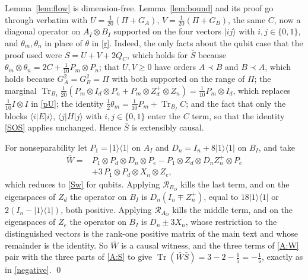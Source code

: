 \documentclass[aps,prl,reprint,superscriptaddress,nofootinbib,longbibliography,raggedbottom]{revtex4-2}
\DeclareMathOperator{\Tr}{Tr}
\newcommand{\R}{\mathcal R}
\newcommand{\ket}[1]{\lvert #1\rangle}
\newcommand{\bra}[1]{\langle #1\rvert}
\newcommand{\proj}[1]{\ket{#1}\!\bra{#1}}
\begin{document}
Lemma~\ref{lem:flow} is dimension-free. Lemma~\ref{lem:bound} and its
proof go through verbatim with $U=\tfrac1{20}(\Pi+G_A)$,
$V=\tfrac1{20}(\Pi+G_B)$, the same $C$, now a diagonal operator on
$A_I\otimes B_I$ supported on the four vectors $\ket{ij}$ with
$i,j\in\{0,1\}$, and $\theta_m,\theta_n$ in place of $\theta$ in
\eqref{r}. Indeed, the only facts about the qubit case that the proof used
were $S=U+V+2Q_C$, which holds for $\bar S$ because
$\theta_m\otimes\theta_n=2C+\tfrac1{10}P_m\otimes P_n$; that $U,V\geq0$
have orders $A\prec B$ and $B\prec A$, which holds because
$G_A^2=G_B^2=\Pi$ with both supported on the range of $\Pi$; the marginal
$\Tr_{B_I}\tfrac1{20}(P_m\otimes I_d\otimes P_n+P_m\otimes Z_d^+\otimes
Z_n)=\tfrac1{10}P_m\otimes I_d$, which replaces
$\tfrac1{10}I\otimes I$ in \eqref{pU}; the identity
$\tfrac12\theta_m=\tfrac1{10}P_m+\Tr_{B_I}C$; and the fact that only the
blocks $\bra iE\ket i$, $\bra jH\ket j$ with $i,j\in\{0,1\}$ enter the
$C$ term, so that the identity \eqref{SOS} applies unchanged. Hence
$\bar S$ is extensibly causal.

For nonseparability let $P_1=\proj1$ on $A_I$ and $D_n=I_n+8\proj1$ on
$B_I$, and take
\begin{equation}\label{A:W}
\begin{split}
\bar W={}&P_1\otimes P_d\otimes D_n\otimes P_e
 -P_1\otimes Z_d\otimes D_nZ_n^+\otimes P_e\\
&+3\,P_1\otimes P_d\otimes X_n\otimes Z_e ,
\end{split}
\end{equation}
which reduces to \eqref{Sw} for qubits. Applying $\R_{B_O}$ kills the last
term, and on the eigenspaces of $Z_d$ the operator on $B_I$ is
$D_n(I_n\mp Z_n^+)$, equal to $18\proj1$ or $2(I_n-\proj1)$, both
positive. Applying $\R_{A_O}$ kills the middle term, and on the eigenspaces
of $Z_e$ the operator on $B_I$ is $D_n\pm3X_n$, whose restriction to the
distinguished vectors is the rank-one positive matrix of the main text and
whose remainder is the identity. So $\bar W$ is a causal witness, and the
three terms of \eqref{A:W} pair with the three parts of \eqref{A:S} to
give $\Tr(\bar W\bar S)=3-2-\tfrac65=-\tfrac15$, exactly as in
\eqref{negative}. \qed
\end{document}
